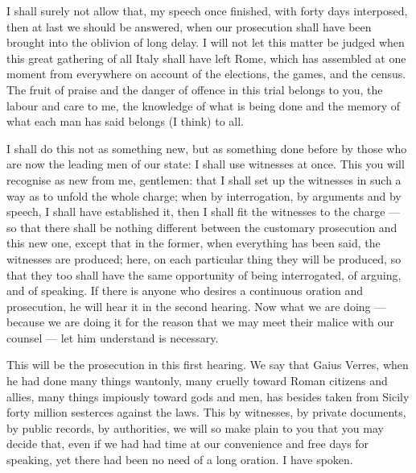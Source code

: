  I shall surely not allow that, my speech once finished, with forty days interposed, then at last we should be answered, when our prosecution shall have been brought into the oblivion of long delay. I will not let this matter be judged when this great gathering of all Italy shall have left Rome, which has assembled at one moment from everywhere on account of the elections, the games, and the census. The fruit of praise and the danger of offence in this trial belongs to you, the labour and care to me, the knowledge of what is being done and the memory of what each man has said belongs (I think) to all.

 I shall do this not as something new, but as something done before by those who are now the leading men of our state: I shall use witnesses at once. This you will recognise as new from me, gentlemen: that I shall set up the witnesses in such a way as to unfold the whole charge; when by interrogation, by arguments and by speech, I shall have established it, then I shall fit the witnesses to the charge --- so that there shall be nothing different between the customary prosecution and this new one, except that in the former, when everything has been said, the witnesses are produced; here, on each particular thing they will be produced, so that they too shall have the same opportunity of being interrogated, of arguing, and of speaking. If there is anyone who desires a continuous oration and prosecution, he will hear it in the second hearing. Now what we are doing --- because we are doing it for the reason that we may meet their malice with our counsel --- let him understand is necessary.

 This will be the prosecution in this first hearing. We say that Gaius Verres, when he had done many things wantonly, many cruelly toward Roman citizens and allies, many things impiously toward gods and men, has besides taken from Sicily forty million sesterces against the laws. This by witnesses, by private documents, by public records, by authorities, we will so make plain to you that you may decide that, even if we had had time at our convenience and free days for speaking, yet there had been no need of a long oration. I have spoken.

